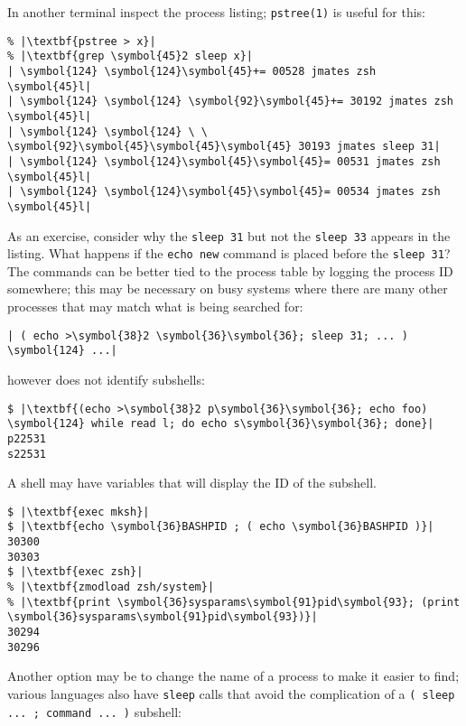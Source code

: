 \documentclass[10pt,a4paper]{article}
\begin{document}
In another terminal inspect the process listing; \texttt{pstree(1)} is
useful for this:

\begin{lstlisting}
% |\textbf{pstree > x}|
% |\textbf{grep \symbol{45}2 sleep x}|
| \symbol{124} \symbol{124}\symbol{45}+= 00528 jmates zsh \symbol{45}l|
| \symbol{124} \symbol{124} \symbol{92}\symbol{45}+= 30192 jmates zsh \symbol{45}l|
| \symbol{124} \symbol{124} \ \ \symbol{92}\symbol{45}\symbol{45}\symbol{45} 30193 jmates sleep 31|
| \symbol{124} \symbol{124}\symbol{45}\symbol{45}= 00531 jmates zsh \symbol{45}l|
| \symbol{124} \symbol{124}\symbol{45}\symbol{45}= 00534 jmates zsh \symbol{45}l|
\end{lstlisting}

As an exercise, consider why the \texttt{sleep 31} but not the
\texttt{sleep 33} appears in the listing. What happens if the
\texttt{echo new} command is placed before the \texttt{sleep 31}? \\

The commands can be better tied to the process table by logging the
process ID somewhere; this may be necessary on busy systems where there
are many other processes that may match what is being searched for:

\begin{lstlisting}
| ( echo >\symbol{38}2 \symbol{36}\symbol{36}; sleep 31; ... ) \symbol{124} ...|
\end{lstlisting}

\texttt{} however does not identify subshells:

\begin{lstlisting}
$ |\textbf{(echo >\symbol{38}2 p\symbol{36}\symbol{36}; echo foo) \symbol{124} while read l; do echo s\symbol{36}\symbol{36}; done}|
p22531
s22531
\end{lstlisting}

A shell may have variables that will display the ID of the subshell.

\begin{lstlisting}
$ |\textbf{exec mksh}|
$ |\textbf{echo \symbol{36}BASHPID ; ( echo \symbol{36}BASHPID )}|
30300
30303
$ |\textbf{exec zsh}|
% |\textbf{zmodload zsh/system}|
% |\textbf{print \symbol{36}sysparams\symbol{91}pid\symbol{93}; (print \symbol{36}sysparams\symbol{91}pid\symbol{93})}|
30294
30296
\end{lstlisting}

Another option may be to change the name of a process to make it easier
to find; various languages also have \texttt{sleep} calls that avoid the
complication of a \texttt{( sleep ... ; command ... )} subshell:
\end{document}
